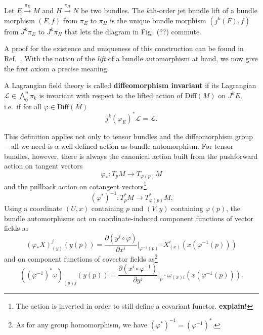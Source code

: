 \begin{definition}
  Let $E \overset{\pi_E}{\longrightarrow} M$ and $H \overset{\pi_H}{\longrightarrow} N$ be two bundles. The $k$th-order jet bundle lift of a bundle morphism $(F,f)$ from $\pi_E$ to $\pi_H$ is the unique bundle morphism $(j^k(F),f)$ from $J^k\pi_E$ to $J^k\pi_H$ that lets the diagram in Fig.~(??) commute.
\end{definition}
A proof for the existence and uniqueness of this construction can be found in Ref.~\cite{Saunders_1989}. With the notion of the \emph{lift} of a bundle automorphism at hand, we now give the first axiom a precise meaning
\begin{definition}
  A Lagrangian field theory is called \textbf{diffeomorphism invariant} if its Lagrangian $\mathscr L\in\textstyle\bigwedge_0^n\pi_k$ is invariant with respect to the lifted action of $\mathrm{Diff}(M)$ on $J^kE$, i.e.~if for all $\varphi\in\mathrm{Diff}(M)$
  \begin{equation}\label{lagrangian_diffeo_invariance}
    j^k(\varphi_E)^\ast \mathscr L = \mathscr L.
  \end{equation}
\end{definition}
This definition applies not only to tensor bundles and the diffeomorphism group---all we need is a well-defined action as bundle automorphism. For tensor bundles, however, there is always the canonical action built from the pushforward action on tangent vectors
\begin{equation}
  \varphi_\ast\colon T_pM\rightarrow T_{\varphi(p)}M
\end{equation}
and the pullback action on cotangent vectors\footnote{The action is inverted in order to still define a covariant functor. \textbf{explain!}\cite{}}
\begin{equation}
   (\varphi^\ast)^{-1}\colon T^\ast_pM\rightarrow T^\ast_{\varphi(p)}M.
\end{equation}
Using a coordinate $(U,x)$ containing $p$ and $(V,y)$ containing $\varphi(p)$, the bundle automorphisms act on coordinate-induced component functions of vector fields as
\begin{equation}\label{diffeo_vector_coordinates}
(\varphi_\ast X)_{(y)}^j(y(p)) = \frac{\partial (y^j\circ \varphi)}{\partial x^i} \Bigg\rvert_{\varphi^{-1}(p)} \cdot X_{(x)}^i(x(\varphi^{-1}(p)))
\end{equation}
and on component functions of covector fields as\footnote{As for any group homomorphism, we have $(\varphi^\ast)^{-1}=(\varphi^{-1})^\ast$.}
\begin{equation}\label{diffeo_covector_coordinates}
((\varphi^{-1})^\ast\omega)_{(y)j}(y(p)) = \frac{\partial (x^i\circ \varphi^{-1})}{\partial y^j}\Bigg\rvert_p \cdot \omega_{(x)i}(x(\varphi^{-1}(p))).
\end{equation}

